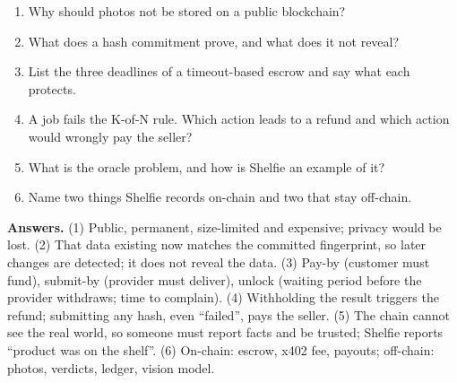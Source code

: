 \begin{quizbox}
\begin{enumerate}
  \item Why should photos not be stored on a public blockchain?
  \item What does a hash commitment prove, and what does it not reveal?
  \item List the three deadlines of a timeout-based escrow and say what each protects.
  \item A job fails the K-of-N rule. Which action leads to a refund and which action would wrongly pay the seller?
  \item What is the oracle problem, and how is Shelfie an example of it?
  \item Name two things Shelfie records on-chain and two that stay off-chain.
\end{enumerate}
{\footnotesize\color{cGrey}\textbf{Answers.} (1) Public, permanent, size-limited and expensive; privacy would be lost. (2) That data existing now matches the committed fingerprint, so later changes are detected; it does not reveal the data. (3) Pay-by (customer must fund), submit-by (provider must deliver), unlock (waiting period before the provider withdraws; time to complain). (4) Withholding the result triggers the refund; submitting any hash, even ``failed'', pays the seller. (5) The chain cannot see the real world, so someone must report facts and be trusted; Shelfie reports ``product was on the shelf''. (6) On-chain: escrow, x402 fee, payouts; off-chain: photos, verdicts, ledger, vision model.\par}
\end{quizbox}

